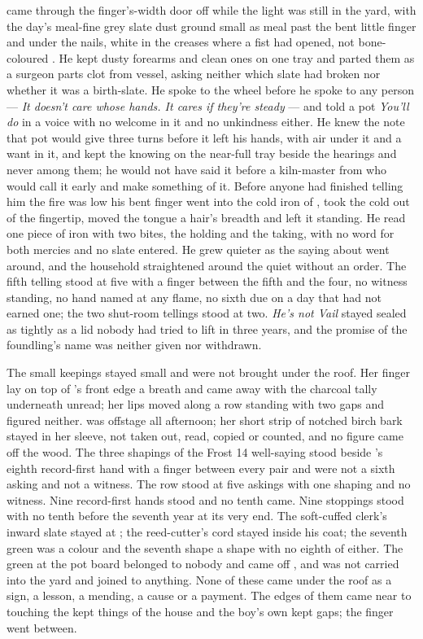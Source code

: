  came through the finger's-width door off  while the light was still in the yard, with the day's meal-fine grey slate dust ground small as meal past the bent little finger and under the nails, white in the creases where a fist had opened, not bone-coloured . He kept dusty forearms and clean ones on one tray and parted them as a surgeon parts clot from vessel, asking neither which slate had broken nor whether it was a birth-slate. He spoke to the wheel before he spoke to any person --- \emph{It doesn't care whose hands. It cares if they're steady} --- and told a pot \emph{You'll do} in a voice with no welcome in it and no unkindness either. He knew the note that pot would give three turns before it left his hands, with air under it and a want in it, and kept the knowing on the near-full tray beside the hearings and never among them; he would not have said it before a kiln-master from  who would call it early and make something of it. Before anyone had finished telling him the fire was low his bent finger went into the cold iron of , took the cold out of the fingertip, moved the tongue a hair's breadth and left it standing. He read one piece of iron with two bites, the holding and the taking, with no  word for both mercies and no slate entered. He grew quieter as the saying about  went around, and the household straightened around the quiet without an order. The fifth telling stood at five with a finger between the fifth and the four, no witness standing, no hand named at any flame, no sixth due on a day that had not earned one; the two shut-room tellings stood at two. \emph{He's not Vail} stayed sealed as tightly as a lid nobody had tried to lift in three years, and the promise of the foundling's name was neither given nor withdrawn.

The small keepings stayed small and were not brought under the roof. Her finger lay on top of 's front edge a breath and came away with the charcoal tally underneath unread; her lips moved along a row standing with two gaps and figured neither.  was offstage all afternoon; her short strip of notched birch bark stayed in her sleeve, not taken out, read, copied or counted, and no figure came off the wood. The three shapings of the Frost 14 well-saying stood beside 's eighth record-first hand with a finger between every pair and were not a sixth asking and not a witness. The row stood at five askings with one shaping and no witness. Nine record-first hands stood and no tenth came. Nine stoppings stood with no tenth before the seventh year at its very end. The soft-cuffed clerk's inward slate stayed at ; the reed-cutter's cord stayed inside his coat; the seventh green was a colour and the seventh shape a shape with no eighth of either. The green at the pot board belonged to nobody and came off , and was not carried into the yard and joined to anything. None of these came under the roof as a sign, a lesson, a mending, a cause or a payment. The edges of them came near to touching the kept things of the house and the boy's own kept gaps; the finger went between.

